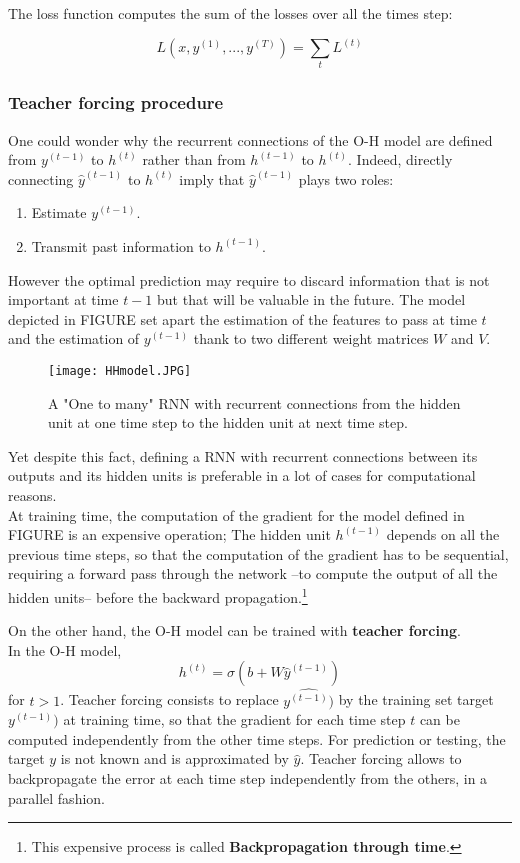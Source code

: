 \documentclass[11pt, onecolumn, a4paper]{report}
\begin{document}
The loss function computes the sum of the losses over all the times step:

$$L(x,y^{(1)},...,y^{(T)}) = \sum_t L^{(t)}$$


\subsubsection{Teacher forcing procedure}

One could wonder why the recurrent connections of the O-H model are defined from $y^{(t-1)}$ to $h^{(t)}$ rather than from $h^{(t-1)}$ to $h^{(t)}$.
Indeed, directly connecting $\hat{y}^{(t-1)}$ to $h^{(t)}$ imply that $\hat{y}^{(t-1)}$ plays two roles:
\begin{enumerate}
    \item Estimate $y^{(t-1)}$.
    \item Transmit past information to $h^{(t-1)}$.
\end{enumerate}

However the optimal prediction may require to discard information that is not important at time $t-1$ but that will be valuable in the future. The model depicted in FIGURE set apart the estimation of the features to pass at time $t$ and the estimation of $y^{(t-1)}$ thank to two different weight matrices $W$ and $V$.\\

\begin{figure}[H]
\texttt{[image: HHmodel.JPG]}
\caption{A "One to many" RNN with recurrent connections from the hidden unit at one time step to the hidden unit at next time step.}
\end{figure}
 
\medskip
Yet despite this fact, defining a RNN with recurrent connections between its outputs and its hidden units is preferable in a lot of cases for computational reasons.\\

At training time, the computation of the gradient for the model defined in FIGURE is an expensive operation; The hidden unit $h^{(t-1)}$ depends on all the previous time steps, so that the computation of the gradient has to be sequential, requiring a forward pass through the network --to compute the output of all the hidden units-- before the backward propagation.\footnote{This expensive process is called \textbf{Backpropagation through time}.} 

On the other hand, the O-H model can be trained with \textbf{teacher forcing}.\\
In the O-H model, $$h^{(t)}=\sigma(b + W\hat{y}^{(t-1)}) $$ for $t>1$. Teacher forcing consists to replace $ \hat{y^{(t-1)})}$ by the training set target $y^{(t-1)})$ at training time, so that the gradient for each time step $t$ can be computed independently from the other time steps. For prediction or testing, the target $y$ is not known and is approximated by $\hat{y}$. Teacher forcing allows to backpropagate the error at each time step independently from the others, in a parallel fashion.
\end{document}
